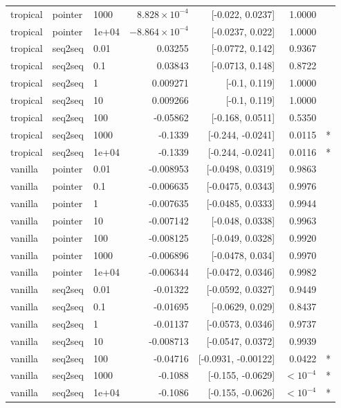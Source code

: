 \documentclass[10pt]{article}
\begin{document}
{\begin{longtable}{lllrrrl}
tropical & pointer & 1000 & $8.828\times10^{-4}$ & [-0.022, 0.0237] & 1.0000 & \\
tropical & pointer & 1e+04 & $-8.864\times10^{-4}$ & [-0.0237, 0.022] & 1.0000 & \\
tropical & seq2seq & 0.01 & 0.03255 & [-0.0772, 0.142] & 0.9367 & \\
tropical & seq2seq & 0.1 & 0.03843 & [-0.0713, 0.148] & 0.8722 & \\
tropical & seq2seq & 1 & 0.009271 & [-0.1, 0.119] & 1.0000 & \\
tropical & seq2seq & 10 & 0.009266 & [-0.1, 0.119] & 1.0000 & \\
tropical & seq2seq & 100 & -0.05862 & [-0.168, 0.0511] & 0.5350 & \\
tropical & seq2seq & 1000 & -0.1339 & [-0.244, -0.0241] & 0.0115 & *\\
tropical & seq2seq & 1e+04 & -0.1339 & [-0.244, -0.0241] & 0.0116 & *\\
vanilla & pointer & 0.01 & -0.008953 & [-0.0498, 0.0319] & 0.9863 & \\
vanilla & pointer & 0.1 & -0.006635 & [-0.0475, 0.0343] & 0.9976 & \\
vanilla & pointer & 1 & -0.007635 & [-0.0485, 0.0333] & 0.9944 & \\
vanilla & pointer & 10 & -0.007142 & [-0.048, 0.0338] & 0.9963 & \\
vanilla & pointer & 100 & -0.008125 & [-0.049, 0.0328] & 0.9920 & \\
vanilla & pointer & 1000 & -0.006896 & [-0.0478, 0.034] & 0.9970 & \\
vanilla & pointer & 1e+04 & -0.006344 & [-0.0472, 0.0346] & 0.9982 & \\
vanilla & seq2seq & 0.01 & -0.01322 & [-0.0592, 0.0327] & 0.9449 & \\
vanilla & seq2seq & 0.1 & -0.01695 & [-0.0629, 0.029] & 0.8437 & \\
vanilla & seq2seq & 1 & -0.01137 & [-0.0573, 0.0346] & 0.9737 & \\
vanilla & seq2seq & 10 & -0.008713 & [-0.0547, 0.0372] & 0.9939 & \\
vanilla & seq2seq & 100 & -0.04716 & [-0.0931, -0.00122] & 0.0422 & *\\
vanilla & seq2seq & 1000 & -0.1088 & [-0.155, -0.0629] & $<10^{-4}$ & *\\
vanilla & seq2seq & 1e+04 & -0.1086 & [-0.155, -0.0626] & $<10^{-4}$ & *\\
\bottomrule
\end{longtable}
}
\end{document}
